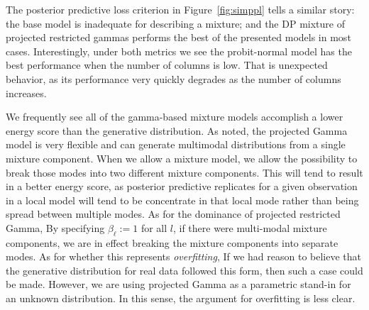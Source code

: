 
The posterior predictive loss criterion in Figure~\ref{fig:simppl} tells a similar story: the base
  model is inadequate for describing a mixture; and the DP mixture of projected restricted gammas
  performs the best of the presented models in most cases.  Interestingly, under both metrics we see
  the probit-normal model has the best performance when the number of columns is low.  That is
  unexpected behavior, as its performance very quickly degrades as the number of columns increases.

We frequently see all of the gamma-based mixture models accomplish a lower energy score than the generative
  distribution.  As \cite{nunez2019} noted, the projected Gamma model is very flexible and can generate
  multimodal distributions from a single mixture component.  When we allow a mixture model, we allow
  the possibility to break those modes into two different mixture components.  This will tend to
  result in a better energy score, as posterior predictive replicates for a given observation in a local
  model will tend to be concentrate in that local mode rather than being spread between multiple
  modes.  As for the dominance of projected restricted Gamma, By specifying $\beta_{\ell} := 1$ for all
  $l$, if there were multi-modal mixture components, we are in effect breaking the mixture components
  into separate modes. As for whether this represents \emph{overfitting}, If we had reason to
  believe that the generative distribution for real data followed this form, then such a case could
  be made.  However, we are using projected Gamma as a parametric stand-in for an unknown distribution.
  In this sense, the argument for overfitting is less clear.

